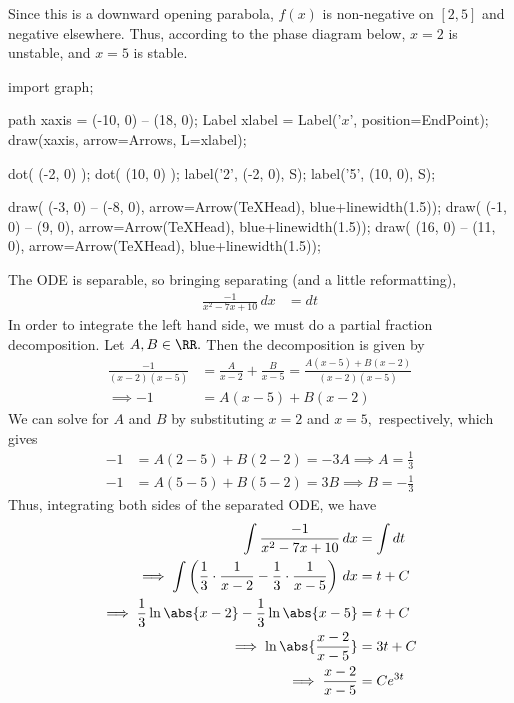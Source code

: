 \documentclass{article}
\begin{document}
\begin{enumerate}
\begin{soln}
			Since this is a downward opening parabola, $f(x)$ is non-negative on $[2, 5]$ and negative elsewhere. Thus, according to the phase diagram below, $x=2$ is unstable, and $x=5$ is stable.
			\begin{center}
				\begin{asy}
					import graph;

					path xaxis = (-10, 0) -- (18, 0);
					Label xlabel = Label('$x$', position=EndPoint);
					draw(xaxis, arrow=Arrows, L=xlabel);

					dot( (-2, 0) );
					dot( (10, 0) );
					label('2', (-2, 0), S);
					label('5', (10, 0), S);

					draw( (-3, 0) -- (-8, 0), arrow=Arrow(TeXHead), blue+linewidth(1.5));
					draw( (-1, 0) -- (9, 0), arrow=Arrow(TeXHead), blue+linewidth(1.5));
					draw( (16, 0) -- (11, 0), arrow=Arrow(TeXHead), blue+linewidth(1.5));
				\end{asy}
			\end{center}
			The ODE is separable, so bringing separating (and a little reformatting), 
			\begin{align*}
				\frac{-1}{x^2-7x+10} \, dx &= dt 
			\end{align*}
			In order to integrate the left hand side, we must do a partial fraction decomposition. Let $A, B\in \RR.$ Then the decomposition is given by
			\begin{align*}
				\frac{-1}{(x-2)(x-5)} &= \frac{A}{x-2} + \frac{B}{x-5} = \frac{A(x-5) + B(x-2)}{(x-2)(x-5)} \\
				\implies -1 &= A(x-5) + B(x-2)
			\end{align*}
			We can solve for $A$ and $B$ by substituting $x=2$ and $x=5,$ respectively, which gives
			\begin{align*}
				-1 &= A(2-5) + B(2-2) = -3A \implies A = \frac{1}{3} \\
				-1 &= A(5-5) + B(5-2) = 3B \implies B = -\frac{1}{3}
			\end{align*}
			Thus, integrating both sides of the separated ODE, we have
			\begin{align*}
				\int \frac{-1}{x^2-7x+10}\, dx &= \int dt \\
				\implies\int\left( \frac{1}{3}\cdot \frac{1}{x-2} - \frac{1}{3}\cdot\frac{1}{x-5} \right)\, dx &= t+C \\
				\implies \frac{1}{3}\ln\abs{x-2} - \frac{1}{3}\ln\abs{x-5} &= t+C \\
				\implies \ln \abs{\frac{x-2}{x-5}} &= 3t+C \\
				\implies \frac{x-2}{x-5} &= Ce^{3t} \\

\end{align*}
\end{soln}
\end{enumerate}
\end{document}
